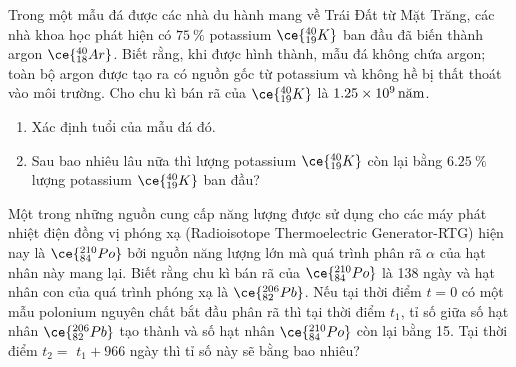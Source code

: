 \begin{ex}
	Trong một mẫu đá được các nhà du hành mang về Trái Đất từ Mặt Trăng, các nhà khoa học phát hiện có $\SI{75}{\percent}$ potassium $\ce{_{19}^{40}K}$ ban đầu đã biến thành argon $\ce{_{18}^{40}Ar}$. Biết rằng, khi được hình thành, mẫu đá không chứa argon; toàn bộ argon được tạo ra có nguồn gốc từ potassium và không hề bị thất thoát vào môi trường. Cho chu kì bán rã của $\ce{_{19}^{40}K}$ là $\SI{1.25E9}{\text{năm}}$.
	\begin{enumerate}[label=\alph*)]
		\item Xác định tuổi của mẫu đá đó.
		\item Sau bao nhiêu lâu nữa thì lượng potassium $\ce{_{19}^{40}K}$ còn lại bằng $\SI{6.25}{\percent}$ lượng potassium $\ce{_{19}^{40}K}$ ban đầu?
	\end{enumerate}
\end{ex}
\begin{ex}
Một trong những nguồn cung cấp năng lượng được sử dụng cho các máy phát nhiệt điện đồng vị phóng xạ (Radioisotope Thermoelectric Generator-RTG) hiện nay là $\ce{_{84}^{210}Po}$ bởi nguồn năng lượng lớn mà quá trình phân rã $\alpha$ của hạt nhân này mang lại. Biết rằng chu kì bán rã của $\ce{_{84}^{210}Po}$ là 138 ngày và hạt nhân con của quá trình phóng xạ là $\ce{_{82}^{206}Pb}$. Nếu tại thời điểm $t=0$ có một mẫu polonium nguyên chất bắt đầu phân rã thì tại thời điểm $t_1$, tỉ số giữa số hạt nhân $\ce{_{82}^{206}Pb}$ tạo thành và số hạt nhân $\ce{_{84}^{210}Po}$ còn lại bằng 15. Tại thời điểm $t_2=$ $t_1+966$ ngày thì tỉ số này sẽ bằng bao nhiêu?	
\end{ex}
